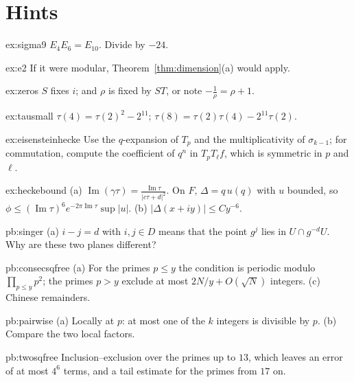 \section{Hints}

\begin{hint}{ex:sigma9}
$E_4E_6=E_{10}$. Divide by $-24$.
\end{hint}
\begin{hint}{ex:e2}
If it were modular, Theorem~\ref{thm:dimension}(a) would apply.
\end{hint}
\begin{hint}{ex:zeros}
$S$ fixes $i$; and $\rho$ is fixed by $ST$, or note $-\frac1\rho=\rho+1$.
\end{hint}
\begin{hint}{ex:tausmall}
$\tau(4)=\tau(2)^2-2^{11}$; $\tau(8)=\tau(2)\tau(4)-2^{11}\tau(2)$.
\end{hint}
\begin{hint}{ex:eisensteinhecke}
Use the $q$-expansion of $T_p$ and the multiplicativity of $\sigma_{k-1}$; for commutation, compute the coefficient of $q^n$ in $T_pT_\ell f$, which is symmetric in $p$ and $\ell$.
\end{hint}
\begin{hint}{ex:heckebound}
(a) $\operatorname{Im}(\gamma\tau)=\frac{\operatorname{Im}\tau}{|c\tau+d|^2}$. On $F$, $\Delta=q\,u(q)$ with $u$ bounded, so $\phi\le(\operatorname{Im}\tau)^6e^{-2\pi\operatorname{Im}\tau}\sup|u|$. (b) $|\Delta(x+iy)|\le Cy^{-6}$.
\end{hint}

\begin{hint}{pb:singer}
(a) $i-j=d$ with $i,j\in D$ means that the point $g^j$ lies in $U\cap g^{-d}U$. Why are these two planes different?
\end{hint}

\begin{hint}{pb:consecsqfree}
(a) For the primes $p\le y$ the condition is periodic modulo $\prod_{p\le y}p^2$; the primes $p>y$ exclude at most $2N/y+O(\sqrt N)$
integers. (c) Chinese remainders.
\end{hint}

\begin{hint}{pb:pairwise}
(a) Locally at $p$: at most one of the $k$ integers is divisible by $p$. (b) Compare the two local factors.
\end{hint}

\begin{hint}{pb:twosqfree}
Inclusion--exclusion over the primes up to $13$, which leaves an error of at most $4^6$ terms, and a tail estimate for the
primes from $17$ on.
\end{hint}

